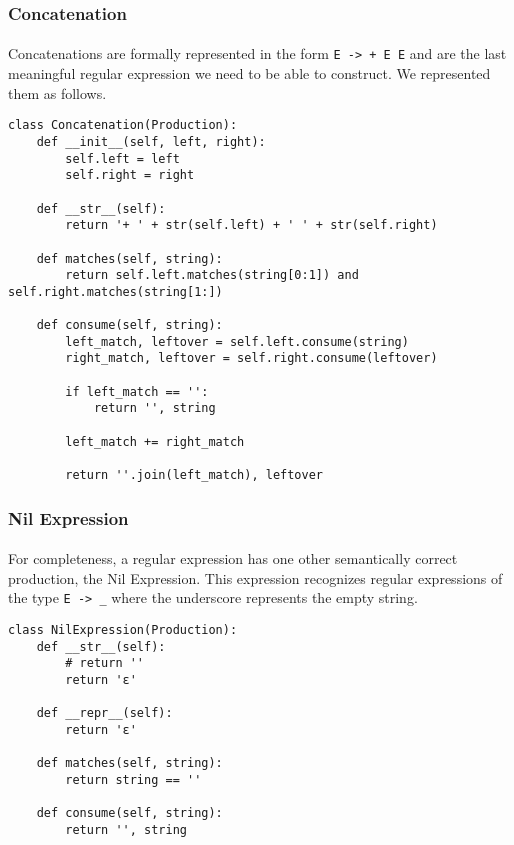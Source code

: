 \documentclass{article}
\begin{document}
\subsubsection{Concatenation}
\label{sec:algos:regex:concat}
\paragraph{} Concatenations are formally represented in the form \verb|E -> + E E| and are the last meaningful regular expression we need to be able to construct. We represented them as follows.

\begin{verbatim}
class Concatenation(Production):
    def __init__(self, left, right):
        self.left = left
        self.right = right
    
    def __str__(self):
        return '+ ' + str(self.left) + ' ' + str(self.right)

    def matches(self, string):
        return self.left.matches(string[0:1]) and self.right.matches(string[1:])
    
    def consume(self, string):
        left_match, leftover = self.left.consume(string)
        right_match, leftover = self.right.consume(leftover)

        if left_match == '':
            return '', string
 
        left_match += right_match

        return ''.join(left_match), leftover
\end{verbatim}

\subsubsection{Nil Expression}
\paragraph{} For completeness, a regular expression has one other 
semantically correct production, the Nil Expression. This expression
recognizes regular expressions of the type \verb|E -> _| where the
underscore represents the empty string.

\begin{verbatim}
class NilExpression(Production):
    def __str__(self):
        # return ''
        return 'ε'

    def __repr__(self):
        return 'ε'

    def matches(self, string):
        return string == ''

    def consume(self, string):
        return '', string
\end{verbatim}
\end{document}
